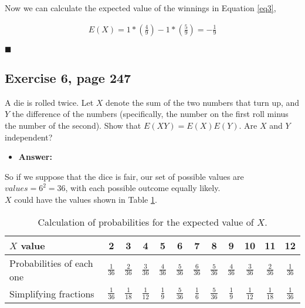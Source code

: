 \documentclass{article}
\begin{document}
Now we can calculate the expected value of the winnings in Equation \ref{eq3},

 \begin{eqnarray}
\label{eq3}
E(X) = 1* \left(\frac{4}{9}\right) - 1 * \left(\frac{5}{9}\right)= - \frac{1}{9} 
\end{eqnarray}
\begin{flushright}
$\blacksquare$
\end{flushright}

\subsection{Exercise 6, page 247}

A die is rolled twice. Let $X$ denote the sum of the two numbers that turn up, and $Y$ the difference of the numbers (specifically, the number on the first roll minus the number of the second). Show that $E(XY) = E(X)E(Y)$. Are $X$ and $Y$ independent?\\
\begin{itemize}
\item \textbf{Answer:}
\end{itemize}

So if we suppose that the dice is fair, our set of possible values are $values = 6^2 =36$, with each possible outcome equally likely.\\

$X$ could have the values shown in Table \ref{tab1}.\\

 \begin{table}[]\caption{Calculation of probabilities for the expected value of $X$.}\label{tab1}
\centering
\begin{tabular}{| p{2cm} | c | c | c | c | c | c | c | c | c | c | c |}
\hline
$X$ value & 2 & 3 & 4 & 5 & 6 & 7 & 8 & 9 & 10 & 11 & 12 \\
\hline 
Probabilities of each one & $\frac{1}{36}$& $\frac{2}{36}$& $\frac{3}{36}$& $\frac{4}{36}$& $\frac{5}{36}$& $\frac{6}{36}$& $\frac{5}{36}$& $\frac{4}{36}$& $\frac{3}{36}$& $\frac{2}{36}$& $\frac{1}{36}$\\
\hline 
Simplifying fractions& $\frac{1}{36}$& $\frac{1}{18}$& $\frac{1}{12}$& $\frac{1}{9}$& $\frac{5}{36}$& $\frac{1}{6}$& $\frac{5}{36}$& $\frac{1}{9}$& $\frac{1}{12}$& $\frac{1}{18}$& $\frac{1}{36}$\\
\hline
\end{tabular}
\end{table}
\end{document}
